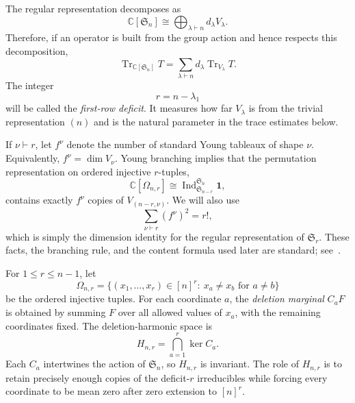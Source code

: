 \documentclass[11pt]{article}
\theoremstyle{remark}
\newcommand{\C}{\mathbb C}
\newcommand{\Sn}{\mathfrak S_n}
\newcommand{\Tr}{\operatorname{Tr}}
\newcommand{\ind}{\mathbf 1}
\begin{document}
The regular representation decomposes as
\[
 \C[\Sn]\cong\bigoplus_{\lambda\vdash n} d_\lambda V_\lambda.
\]
Therefore, if an operator is built from the group action and hence respects this decomposition,
\[
 \Tr_{\C[\Sn]}T
 =\sum_{\lambda\vdash n}d_\lambda\Tr_{V_\lambda}T.
\]
The integer
\[
 r=n-\lambda_1
\]
will be called the \emph{first-row deficit}.  It measures how far $V_\lambda$ is from the trivial representation $(n)$ and is the natural parameter in the trace estimates below.

If $\nu\vdash r$, let $f^\nu$ denote the number of standard Young tableaux of shape $\nu$.  Equivalently, $f^\nu=\dim V_\nu$.  Young branching implies that the permutation representation on ordered injective $r$-tuples,
\[
 \C[\Omega_{n,r}]
 \cong \operatorname{Ind}_{\mathfrak S_{n-r}}^{\Sn}\ind,
\]
contains exactly $f^\nu$ copies of $V_{(n-r,\nu)}$.  We will also use
\[
 \sum_{\nu\vdash r}(f^\nu)^2=r!,
\]
which is simply the dimension identity for the regular representation of $\mathfrak S_r$.  These facts, the branching rule, and the content formula used later are standard; see~\cite{Sagan}.

For $1\le r\le n-1$, let
\[
 \Omega_{n,r}=\{(x_1,\ldots,x_r)\in[n]^r:\ x_a\ne x_b\text{ for }a\ne b\}
\]
be the ordered injective tuples.  For each coordinate $a$, the \emph{deletion marginal} $C_aF$ is obtained by summing $F$ over all allowed values of $x_a$, with the remaining coordinates fixed.  The deletion-harmonic space is
\[
 H_{n,r}=\bigcap_{a=1}^r\ker C_a.
\]
Each $C_a$ intertwines the action of $\Sn$, so $H_{n,r}$ is invariant.  The role of $H_{n,r}$ is to retain precisely enough copies of the deficit-$r$ irreducibles while forcing every coordinate to be mean zero after zero extension to $[n]^r$.
\end{document}

